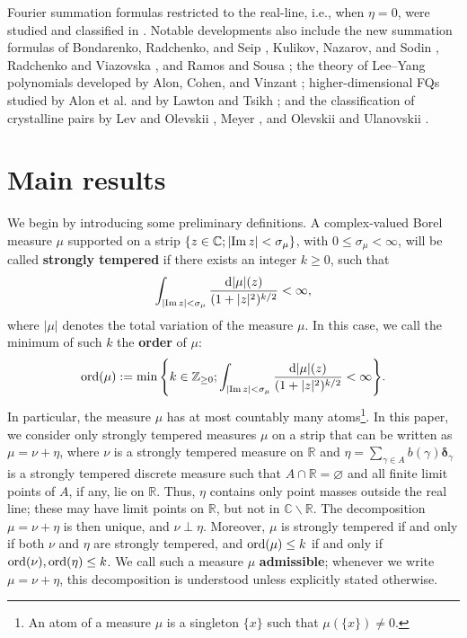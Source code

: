 \documentclass[a4paper,reqno,12pt]{amsart}
\newcommand{\z}{\mathbb{Z}}
\renewcommand{\r}{\mathbb{R}}
\newcommand{\cp}{\mathbb{C}} %
\newcommand{\bo}{\boldsymbol}
\newcommand{\ga}{\gamma}
\newcommand{\si}{\sigma}
\newcommand{\ord}{{\rm ord}}
\renewcommand{\d}{\mathrm{d}}
\newcommand{\1}{{\bf 1}}
\newcommand{\del}{{\bo \delta}}
\renewcommand{\Im}{{\rm Im}\,}
\begin{document}
Fourier summation formulas restricted to the real-line, i.e., when $\eta=0$, were studied and classified in \cite{G23,GV}. Notable developments also include the new summation formulas of Bondarenko, Radchenko, and Seip \cite{BRS}, Kulikov, Nazarov, and Sodin \cite{KNS}, Radchenko and Viazovska \cite{RV}, and Ramos and Sousa \cite{RS,RS1}; the theory of Lee--Yang polynomials developed by Alon, Cohen, and Vinzant \cite{ACV,AV}; higher-dimensional FQs studied by Alon et al. and by Lawton and Tsikh \cite{AKKV25,LT25}; and the classification of crystalline pairs by Lev and Olevskii \cite{LO,LO2,LO3}, Meyer \cite{Mey23,Mey,Mey17}, and Olevskii and Ulanovskii \cite{OU,OU2}.

\section{Main results}

We begin by introducing some preliminary definitions. A complex-valued Borel measure $\mu$ supported on a strip $\{z\in\cp;|\Im{z}|<\sigma_\mu\}$, with $0\leq\si_\mu<\infty$, will be called \textbf{strongly tempered} if there exists an integer $k\geq0$, such that
\begin{equation}
    \int_{|\Im{z}|<\si_\mu} \frac{\d|\mu|(z)}{(1+|z|^2)^{k/2}}<\infty,
\end{equation}
where $|\mu|$ denotes the total variation of the measure $\mu$. In this case, we call the minimum of such $k$ the \textbf{order} of $\mu$:
\begin{equation}
    \ord{(\mu)}:=\min{\left\{k\in\z_{\geq0};\int_{|\Im{z}|<\si_\mu} \frac{\d|\mu|(z)}{(1+|z|^2)^{k/2}}<\infty\right\}}.
\end{equation}
In particular, the measure $\mu$ has at most countably many atoms\footnote{An atom of a measure $\mu$ is a singleton $\{x\}$ such that $\mu(\{x\})\neq0$.}. In this paper, we consider only strongly tempered measures $\mu$ on a strip that can be written as $\mu=\nu+\eta$, where $\nu$ is a strongly tempered measure on $\r$ and $\eta=\sum_{\ga\in A} b(\ga)\del_\ga$ is a strongly tempered discrete measure such that $A\cap\r=\varnothing$ and all finite limit points of $A$, if any, lie on $\r$. Thus, $\eta$ contains only point masses outside the real line; these may have limit points on $\r$, but not in $\cp\backslash\r$. The decomposition $\mu=\nu+\eta$ is then unique, and $\nu\perp\eta$. Moreover, $\mu$ is strongly tempered if and only if both $\nu$ and $\eta$ are strongly tempered, and $\ord(\mu)\leq k$ if and only if $\ord(\nu),\ord(\eta)\leq k$. We call such a measure $\mu$ \textbf{admissible}; whenever we write $\mu=\nu+\eta$, this decomposition is understood unless explicitly stated otherwise.
\end{document}
